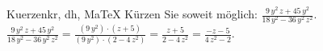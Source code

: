 \begin{MAufgabe}{Kuerzen}{kr, dh, MaTeX}
K\"urzen Sie soweit m\"oglich: $\frac{9\, y^2\, z + 45\, y^2}{18\, y^2 - 36\, y^2\, z^2}$.\\ 
\ifLsg\MLoesung
\quad $\frac{9\, y^2\, z + 45\, y^2}{18\, y^2 - 36\, y^2\, z^2}=\frac{(9\, y^2)\cdot(z + 5)}{(9\, y^2)\cdot(2 - 4\, z^2)}=\frac{z + 5}{2 - 4\, z^2}=\frac{ - z - 5}{4\, z^2 - 2}$.\else\relax\fi
 \end{MAufgabe}